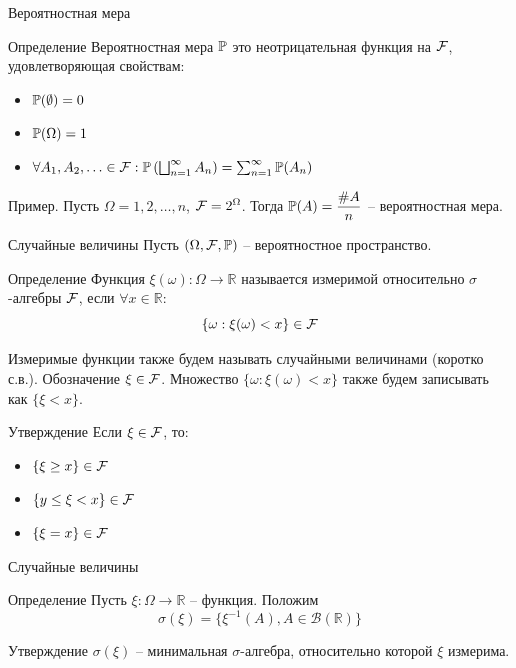 \documentclass{beamer}
\begin{document}
\begin{frame}{Вероятностная мера}
    \begin{block}{Определение}
        Вероятностная мера $\mathbb{P}$ это неотрицательная функция на $\mathcal{F}$, удовлетворяющая свойствам:
        \begin{itemize}
            \item $\mathbb{P}(\emptyset) = 0$
            \item $\mathbb{P}(\Omega) = 1$
            \item $\forall A_1, A_2, \ldots \in \mathcal{F}: \mathbb{P}\left(\bigsqcup_{n=1}^{\infty}A_n\right) = \sum_{n=1}^{\infty} \mathbb{P}(A_n)$ 
        \end{itemize}
    \end{block}
    Пример. Пусть $\Omega = {1, 2, \ldots, n}$, $\mathcal{F}=2^{\Omega}$. Тогда $\mathbb{P}(A)=\dfrac{\#A}{n}$ -- вероятностная мера.
\end{frame}

\begin{frame}{Случайные величины}
    Пусть $(\Omega, \mathcal{\mathcal{F}}, \mathbb{P})$ -- вероятностное пространство. 
    \begin{block}{Определение}
        Функция $\xi(\omega): \Omega \to \mathbb{R}$ называется измеримой относительно $\sigma$-алгебры ${\mathcal{F}}$, если $\forall x \in \mathbb{R}$:
        $$
            \{\omega : \xi(\omega) < x \} \in {\mathcal{F}}
        $$
    \end{block}
    Измеримые функции также будем называть случайными величинами (коротко с.в.). Обозначение $\xi \in \mathcal{\mathcal{F}}$.
    Множество $\{\omega : \xi(\omega) < x \}$ также будем записывать как $\{ \xi < x\}$.

    \begin{block}{Утверждение}
    Если $\xi \in \mathcal{\mathcal{F}}$, то:
        \begin{itemize}
            \item $\{\xi \geq x \} \in {\mathcal{F}}$
            \item $\{y \leq \xi < x \} \in {\mathcal{F}}$
            \item $\{\xi = x \} \in {\mathcal{F}}$
        \end{itemize}
    \end{block}
\end{frame}

\begin{frame}{Случайные величины}
    \begin{block}{Определение}
        Пусть $\xi : \Omega\to\mathbb{R}$ -- функция.
        Положим 
        $$\sigma(\xi) = \{ \xi^{-1}(A), A\in \mathcal{B}(\mathbb{R})\}$$
    \end{block}
    \begin{block}{Утверждение}
         $\sigma(\xi)$ -- минимальная $\sigma$-алгебра, относительно которой $\xi$ измерима.
    \end{block}
\end{frame}
\end{document}
